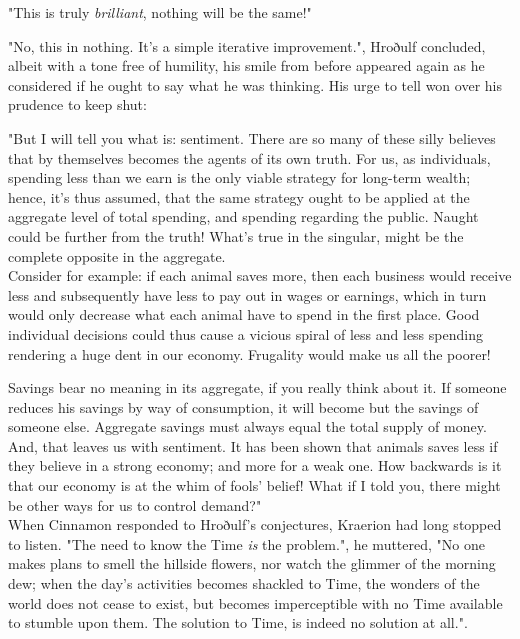 "This is truly \textit{brilliant}, nothing will be the same!"

"No, this in nothing. It's a simple iterative improvement.", Hroðulf concluded, albeit with a tone free of humility, his smile from before appeared again as he considered if he ought to say what he was thinking. His urge to tell won over his prudence to keep shut: 

"But I will tell you what is: sentiment. There are so many of these silly believes that by themselves becomes the agents of its own truth. For us, as individuals, spending less than we earn is the only viable strategy for long-term wealth; hence, it's thus assumed, that the same strategy ought to be applied at the aggregate level of total spending, and spending regarding the public. Naught could be further from the truth! What's true in the singular, might be the complete opposite in the aggregate.\\

Consider for example: if each animal saves more, then each business would receive less and subsequently have less to pay out in wages or earnings, which in turn would only decrease what each animal have to spend in the first place. Good individual decisions could thus cause a vicious spiral of less and less spending rendering a huge dent in our economy. Frugality would make us all the poorer! 

Savings bear no meaning in its aggregate, if you really think about it. If someone reduces his savings by way of consumption, it will become but the savings of someone else. Aggregate savings must always equal the total supply of money.\\

And, that leaves us with sentiment. It has been shown that animals saves less if they believe in a strong economy; and more for a weak one. How backwards is it that our economy is at the whim of fools' belief! What if I told you, there might be other ways for us to control demand?"\\

When Cinnamon responded to Hroðulf's conjectures, Kraerion had long stopped to listen. "The need to know the Time \textit{is} the problem.", he muttered, "No one makes plans to smell the hillside flowers, nor watch the glimmer of the morning dew; when the day's activities becomes shackled to Time, the wonders of the world does not cease to exist, but becomes imperceptible with no Time available to stumble upon them. The solution to Time, is indeed no solution at all.". 

